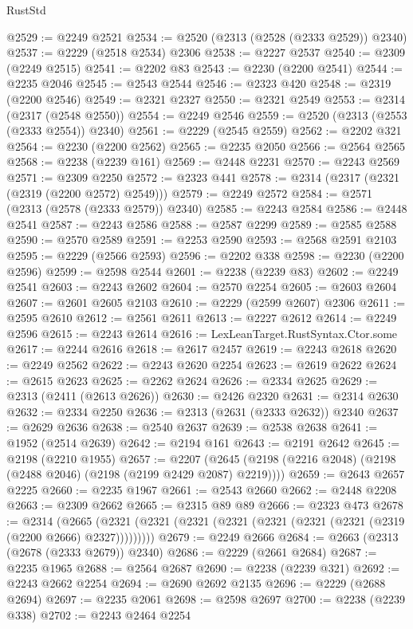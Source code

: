 \begin{lexlean}{RustStd}
\begin{coremodule}
@2529 := @2249 @2521
@2534 := @2520 (@2313 (@2528 (@2333 @2529)) @2340)
@2537 := @2229 (@2518 @2534) @2306
@2538 := @2227 @2537
@2540 := @2309 (@2249 @2515)
@2541 := @2202 @83
@2543 := @2230 (@2200 @2541)
@2544 := @2235 @2046
@2545 := @2543 @2544
@2546 := @2323 @420
@2548 := @2319 (@2200 @2546)
@2549 := @2321 @2327
@2550 := @2321 @2549
@2553 := @2314 (@2317 (@2548 @2550))
@2554 := @2249 @2546
@2559 := @2520 (@2313 (@2553 (@2333 @2554)) @2340)
@2561 := @2229 (@2545 @2559)
@2562 := @2202 @321
@2564 := @2230 (@2200 @2562)
@2565 := @2235 @2050
@2566 := @2564 @2565
@2568 := @2238 (@2239 @161)
@2569 := @2448 @2231
@2570 := @2243 @2569
@2571 := @2309 @2250
@2572 := @2323 @441
@2578 := @2314 (@2317 (@2321 (@2319 (@2200 @2572) @2549)))
@2579 := @2249 @2572
@2584 := @2571 (@2313 (@2578 (@2333 @2579)) @2340)
@2585 := @2243 @2584
@2586 := @2448 @2541
@2587 := @2243 @2586
@2588 := @2587 @2299
@2589 := @2585 @2588
@2590 := @2570 @2589
@2591 := @2253 @2590
@2593 := @2568 @2591 @2103
@2595 := @2229 (@2566 @2593)
@2596 := @2202 @338
@2598 := @2230 (@2200 @2596)
@2599 := @2598 @2544
@2601 := @2238 (@2239 @83)
@2602 := @2249 @2541
@2603 := @2243 @2602
@2604 := @2570 @2254
@2605 := @2603 @2604
@2607 := @2601 @2605 @2103
@2610 := @2229 (@2599 @2607) @2306
@2611 := @2595 @2610
@2612 := @2561 @2611
@2613 := @2227 @2612
@2614 := @2249 @2596
@2615 := @2243 @2614
@2616 := LexLeanTarget.RustSyntax.Ctor.some
@2617 := @2244 @2616
@2618 := @2617 @2457
@2619 := @2243 @2618
@2620 := @2249 @2562
@2622 := @2243 @2620 @2254
@2623 := @2619 @2622
@2624 := @2615 @2623
@2625 := @2262 @2624
@2626 := @2334 @2625
@2629 := @2313 (@2411 (@2613 @2626))
@2630 := @2426 @2320
@2631 := @2314 @2630
@2632 := @2334 @2250
@2636 := @2313 (@2631 (@2333 @2632)) @2340
@2637 := @2629 @2636
@2638 := @2540 @2637
@2639 := @2538 @2638
@2641 := @1952 (@2514 @2639)
@2642 := @2194 @161
@2643 := @2191 @2642
@2645 := @2198 (@2210 @1955)
@2657 := @2207 (@2645 (@2198 (@2216 @2048) (@2198 (@2488 @2046) (@2198 (@2199 @2429 @2087) @2219))))
@2659 := @2643 @2657 @2225
@2660 := @2235 @1967
@2661 := @2543 @2660
@2662 := @2448 @2208
@2663 := @2309 @2662
@2665 := @2315 @89 @89
@2666 := @2323 @473
@2678 := @2314
    (@2665 (@2321 (@2321 (@2321 (@2321 (@2321 (@2321 (@2321 (@2319 (@2200 @2666) @2327)))))))))
@2679 := @2249 @2666
@2684 := @2663 (@2313 (@2678 (@2333 @2679)) @2340)
@2686 := @2229 (@2661 @2684)
@2687 := @2235 @1965
@2688 := @2564 @2687
@2690 := @2238 (@2239 @321)
@2692 := @2243 @2662 @2254
@2694 := @2690 @2692 @2135
@2696 := @2229 (@2688 @2694)
@2697 := @2235 @2061
@2698 := @2598 @2697
@2700 := @2238 (@2239 @338)
@2702 := @2243 @2464 @2254

\end{coremodule}
\end{lexlean}

